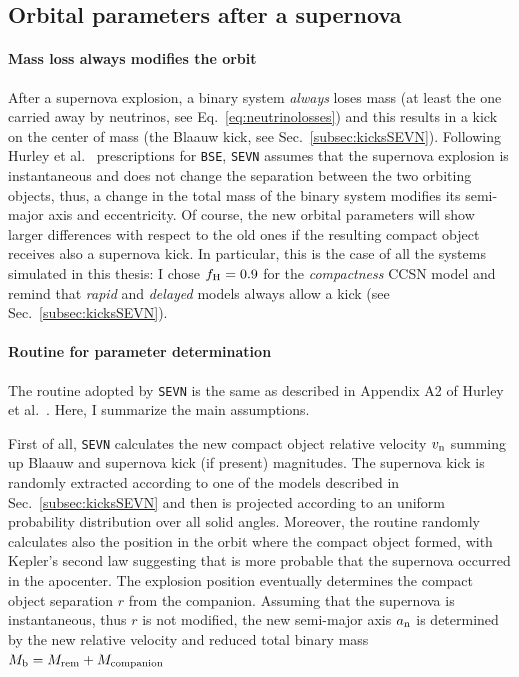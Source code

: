 \documentclass[a4paper,titlepage]{book}     	%
\begin{document}
\subsection{Orbital parameters after a supernova}\label{subsec:SEVNpostsupernovaorbit}
\paragraph{Mass loss always modifies the orbit} After a supernova explosion, a binary system \emph{always} loses mass (at least the one carried away by neutrinos, see Eq.\ \ref{eq:neutrinolosses}) and this results in a kick on the center of mass (the Blaauw kick, see Sec.\ \ref{subsec:kicksSEVN}). Following Hurley et al.\ \cite{Hurley2002} prescriptions for \texttt{BSE}, \texttt{SEVN} assumes that the supernova explosion is instantaneous and does not change the separation between the two orbiting objects, thus, a change in the total mass of the binary system modifies its semi-major axis and eccentricity. Of course, the new orbital parameters will show larger differences with respect to the old ones if the resulting compact object receives also a supernova kick. In particular, this is the case of all the systems simulated in this thesis: I chose $f_{\rm H}=0.9$ for the \emph{compactness} CCSN model and remind that \emph{rapid} and \emph{delayed} models always allow a kick (see Sec.\ \ref{subsec:kicksSEVN}).

\paragraph{Routine for parameter determination} The routine adopted by \texttt{SEVN} is the same as described in Appendix A2 of Hurley et al.\ \cite{Hurley2002}. Here, I summarize the main assumptions.

First of all, \texttt{SEVN} calculates the new compact object relative velocity $v_{\rm n}$ summing up Blaauw and supernova kick (if present) magnitudes. The supernova kick is randomly extracted according to one of the models described in Sec.\ \ref{subsec:kicksSEVN} and then is projected according to an uniform probability distribution over all solid angles. Moreover, the routine randomly calculates also the position in the orbit where the compact object formed, with Kepler's second law suggesting that is more probable that the supernova occurred in the apocenter. The explosion position eventually determines the compact object separation $r$ from the companion. Assuming that the supernova is instantaneous, thus $r$ is not modified, the new semi-major axis $a_{\rm n}$ is determined by the new relative velocity and reduced total binary mass $M_{\rm b} = M_{\rm rem} + M_{\rm companion}$
\end{document}
